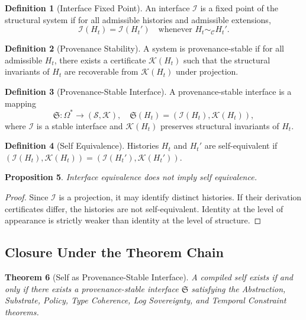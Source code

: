 \documentclass[12pt, a4paper]{article}
\theoremstyle{plain}
\newtheorem{theorem}{Theorem}[section]
\newtheorem{proposition}[theorem]{Proposition}
\theoremstyle{definition}
\newtheorem{definition}[theorem]{Definition}
\theoremstyle{remark}
\begin{document}
\begin{definition}[Interface Fixed Point]
An interface $\mathcal{I}$ is a fixed point of the structural system if for all admissible histories and admissible extensions,
\[
\mathcal{I}(H_t) = \mathcal{I}(H_t') \quad \text{whenever } H_t \sim_{\mathcal{C}} H_t'.
\]
\end{definition}

\begin{definition}[Provenance Stability]
A system is provenance-stable if for all admissible $H_t$, there exists a certificate $\mathcal{K}(H_t)$ such that the structural invariants of $H_t$ are recoverable from $\mathcal{K}(H_t)$ under projection.
\end{definition}

\begin{definition}[Provenance-Stable Interface]
A provenance-stable interface is a mapping
\[
\mathfrak{S} : \Omega^* \to (\mathcal{S}, \mathcal{K}), \quad \mathfrak{S}(H_t) = (\mathcal{I}(H_t), \mathcal{K}(H_t)),
\]
where $\mathcal{I}$ is a stable interface and $\mathcal{K}(H_t)$ preserves structural invariants of $H_t$.
\end{definition}

\begin{definition}[Self Equivalence]
Histories $H_t$ and $H_t'$ are self-equivalent if $(\mathcal{I}(H_t), \mathcal{K}(H_t)) = (\mathcal{I}(H_t'), \mathcal{K}(H_t'))$.
\end{definition}

\begin{proposition}
Interface equivalence does not imply self equivalence.
\end{proposition}

\begin{proof}
Since $\mathcal{I}$ is a projection, it may identify distinct histories. If their derivation certificates differ, the histories are not self-equivalent. Identity at the level of appearance is strictly weaker than identity at the level of structure.
\end{proof}

\subsection{Closure Under the Theorem Chain}

\begin{theorem}[Self as Provenance-Stable Interface]
\label{thm:psi}
A compiled self exists if and only if there exists a provenance-stable interface $\mathfrak{S}$ satisfying the Abstraction, Substrate, Policy, Type Coherence, Log Sovereignty, and Temporal Constraint theorems.
\end{theorem}
\end{document}
